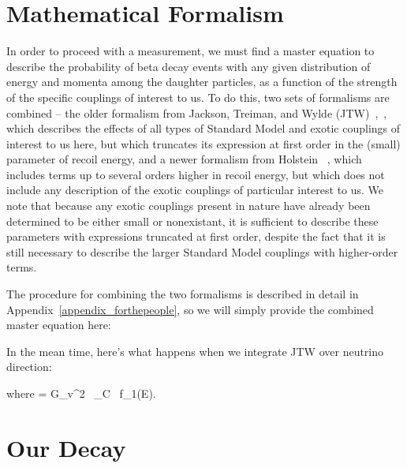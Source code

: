 \section{Mathematical Formalism}
	In order to proceed with a measurement, we must find a master equation to describe the probability of beta decay events with any given distribution of energy and momenta among the daughter particles, as a function of the strength of the specific couplings of interest to us.  To do this, two sets of formalisms are combined -- the older formalism from Jackson, Treiman, and Wylde (JTW)~\cite{jtw},~\cite{jtw_coulomb}, which describes the effects of all types of Standard Model and exotic couplings of interest to us here, but which truncates its expression at first order in the (small) parameter of recoil energy, and a newer formalism from Holstein ~\cite{holstein}, which includes terms up to several orders higher in recoil energy, but which does not include any description of the exotic couplings of particular interest to us.  We note that because any exotic couplings present in nature have already been determined to be either small or nonexistant, it is sufficient to describe these parameters with expressions truncated at first order, despite the fact that it is still necessary to describe the larger Standard Model couplings with higher-order terms. 
	
	The procedure for combining the two formalisms is described in detail in Appendix~\ref{appendix_forthepeople}, so we will simply provide the combined master equation here:



In the mean time, here's what happens when we integrate JTW over neutrino direction:

where 
\bea
\xi = G_v^2 \, \cos\theta_C \, f_1(E).
\eea



\section{Our Decay}


